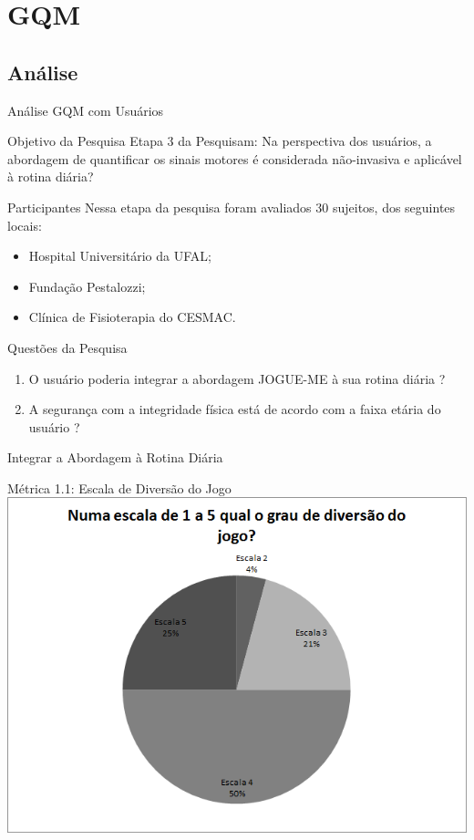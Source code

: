 \documentclass{beamer}
\begin{document}
\section{GQM}
\subsection{Análise}
\begin{frame}{Análise GQM com Usuários} 
    \begin{block}{Objetivo da Pesquisa}
      Etapa 3 da Pesquisam: Na perspectiva dos usuários, a abordagem de quantificar os sinais motores é considerada não-invasiva e aplicável à rotina diária?
    \end{block}
		\begin{block}{Participantes}
		Nessa etapa da pesquisa foram avaliados 30 sujeitos, dos seguintes locais: 
			\begin{itemize}
				\item Hospital Universitário da UFAL;
				\item Fundação Pestalozzi;
				\item Clínica de Fisioterapia do CESMAC.
			\end{itemize}
    \end{block}
\end{frame} 


\begin{frame}{Questões da Pesquisa} 
    \begin{block}{}
			\begin{enumerate}
				\item O usuário poderia integrar a abordagem JOGUE-ME à sua rotina diária ?
				\item A segurança com a integridade física está de acordo com a faixa etária do usuário ?
			\end{enumerate}
    \end{block}
\end{frame}


\begin{frame}{Integrar a Abordagem à Rotina Diária} 
    \begin{block}{Métrica 1.1: Escala de Diversão do Jogo}
			\center \includegraphics[height=2.6 in]{img/chart_1-.png}
    \end{block}
\end{frame}
\end{document}

